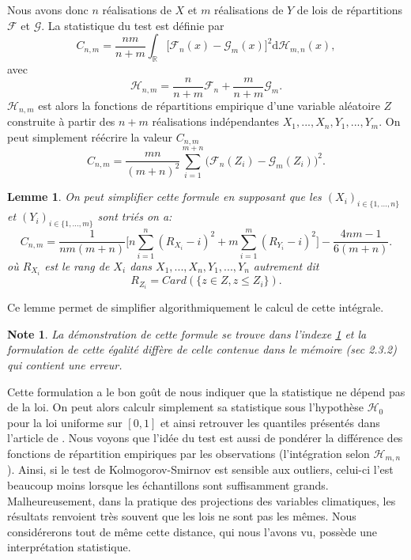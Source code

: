 \documentclass[a4paper,11pt]{article}
\numberwithin{equation}{section}
\newtheorem{lemma}{Lemme}
\newtheorem{note}{Note}
\begin{document}
Nous avons donc $n$ réalisations de $X$ et $m$ réalisations de $Y$ de lois de répartitions $\mathcal{F}$ et $\mathcal{G}$.
La statistique du test est définie par
\begin{equation}
	C_{n,m}=\frac{nm}{n+m}\int_{\mathbb{R}}\big[ \mathcal{F}_{n}(x)-\mathcal{G}_{m}(x)\big]^{2} \mathrm{d} \mathcal{H}_{m,n}(x),
\end{equation}
avec
\begin{equation}
	\mathcal{H}_{n,m}=\frac{n}{n+m}\mathcal{F}_n+\frac{m}{n+m}\mathcal{G}_m.
\end{equation}
$\mathcal{H}_{n,m}$ est alors la fonctions de répartitions empirique d'une variable aléatoire $Z$ construite à partir des $n+m$ réalisations indépendantes $X_1,...,X_n,Y_1,...,Y_m$. On peut simplement réécrire la valeur $C_{n,m}$
\begin{equation}
	C_{n,m}=\frac{mn}{(m+n)^2}\sum_{i=1}^{m+n}\big(\mathcal{F}_n(Z_i)-\mathcal{G}_{m}(Z_i)\big)^2.
\end{equation}

\begin{lemma}
	\label{C-v}
	On peut simplifier cette formule en supposant que les $(X_i)_{i\in \{1,...,n\}}$ et $(Y_i)_{i\in \{1,...,m\}}$ sont triés on a:
	\begin{equation}
		C_{n,m}=\frac{1}{nm(m+n)}\Big[ n\sum_{i=1}^{n}(R_{X_i}-i)^2+ m\sum_{i=1}^{m}(R_{Y_i}-i)^2\Big]-\frac{4nm-1}{6(m+n)}.
	\end{equation}
	où $R_{X_i}$ est le rang de $X_i$ dans $X_1,...,X_n,Y_1,...,Y_n$ autrement dit 
	\[R_{Z_i}=Card(\{z\in Z, z\leq Z_i\}).\] 
\end{lemma}
Ce lemme permet de simplifier algorithmiquement le calcul de cette intégrale.
\begin{note}
	La démonstration de cette formule se trouve dans l'indexe \ref{C-v} et la formulation de cette égalité diffère de celle contenue dans le mémoire \cite{ethier2011propos}(sec 2.3.2) qui contient une erreur.
\end{note}
Cette formulation a le bon goût de nous indiquer que la statistique ne dépend pas de la loi. On peut alors calculr simplement sa statistique sous l'hypothèse $\mathcal{H}_0$ pour la loi uniforme sur $[0,1]$ et ainsi retrouver les quantiles présentés dans l'article de \cite{buning2002robustness}. Nous voyons que l'idée du test est aussi de pondérer la différence des fonctions de répartition empiriques par les observations (l'intégration selon $\mathcal{H}_{m,n}$). Ainsi, si le test de Kolmogorov-Smirnov est sensible aux outliers, celui-ci l’est beaucoup moins lorsque les échantillons sont suffisamment grands. Malheureusement, dans la pratique des projections des variables climatiques, les résultats renvoient très souvent que les lois ne sont pas les mêmes. Nous considérerons tout de même cette distance, qui nous l'avons vu, possède une interprétation statistique.  
\end{document}
